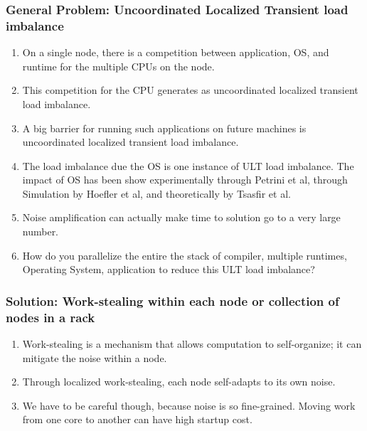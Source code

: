 \begin{frame} 
\frametitle{General Problem: Uncoordinated Localized Transient load imbalance} 
\begin{enumerate} 
\item \small On a single node, there is a competition between application, OS, and 
      runtime for the multiple CPUs on the node. 
\item \small This competition for the CPU generates as uncoordinated localized transient load imbalance. 
\item \small A big barrier for running such applications on future machines is uncoordinated 
localized transient load imbalance. 
\item \small The load imbalance due the OS is one instance of ULT load imbalance. 
The impact of OS has been show experimentally through Petrini et al, 
through Simulation by Hoefler et al,  and theoretically by Tsasfir et al. 
\item \small Noise amplification can actually make time to solution go to a very large number. 
\item \small How do you parallelize the entire the stack of compiler,
multiple runtimes, Operating System, application to reduce this ULT load imbalance? 
\end{enumerate} 
\end{frame} 

\begin{frame}
\frametitle{Solution: Work-stealing within each node or collection of nodes in a rack}
\begin{enumerate}
\item \small Work-stealing is a mechanism that allows computation to self-organize;  
it can mitigate the noise within a node.  
\item \small Through localized work-stealing, each node self-adapts to its own noise. 
\item \small We have to be careful though, because noise is so fine-grained. Moving work
from one core to another can have high startup cost.    
\end{enumerate}
\end{frame} 

